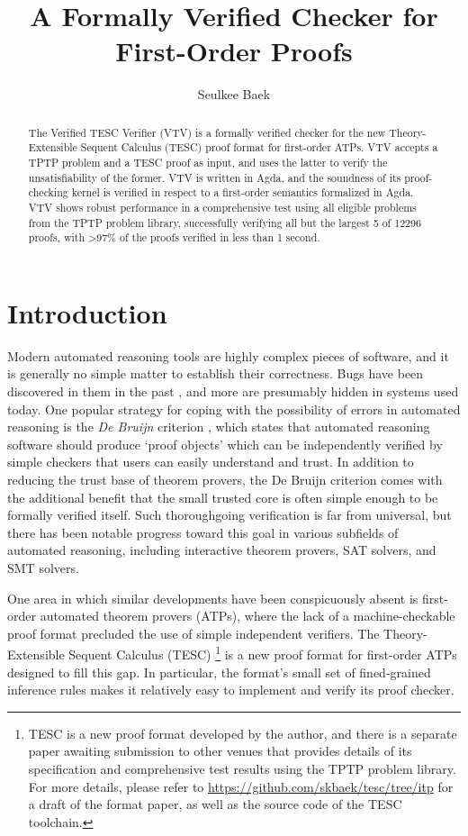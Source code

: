\documentclass{lipics-v2021}
\title{A Formally Verified Checker for First-Order Proofs}
\author{Seulkee Baek}{Department of Philosophy, Carnegie Mellon University, United States}{seulkeeb@andrew.cmu.edu}{}{}
\begin{document}
\maketitle

\begin{abstract}

The Verified TESC Verifier (VTV) is a formally verified checker for the new 
Theory-Extensible Sequent Calculus (TESC) proof format for first-order ATPs. 
VTV accepts a TPTP problem and a TESC proof as input, and uses the latter to 
verify the unsatisfiability of the former. VTV is written in Agda, and the 
soundness of its proof-checking kernel is verified in respect to a first-order
semantics formalized in Agda. VTV shows robust performance in a comprehensive 
test using all eligible problems from the TPTP problem library, successfully 
verifying all but the largest 5 of 12296 proofs, with >97\% of the 
proofs verified in less than 1 second. 

\end{abstract}

\section{Introduction}

Modern automated reasoning tools are highly complex pieces of software, 
and it is generally no simple matter to establish their correctness.
Bugs have been discovered in them in the past \cite{reger2017testing,harrison2006towards}, 
and more are presumably hidden in systems used today. 
One popular strategy for coping with the possibility of errors 
in automated reasoning is the \textit{De Bruijn} criterion \cite{barendregt2005challenge}, 
which states that automated reasoning software should produce `proof objects' which can be 
independently verified by simple checkers that users can easily understand 
and trust. In addition to reducing the trust base of theorem provers, 
the De Bruijn criterion comes with the additional benefit that the 
small trusted core is often simple enough to be formally verified itself. 
Such thoroughgoing verification is far from universal, but there has been notable 
progress toward this goal in various subfields of automated reasoning, including 
interactive theorem provers, SAT solvers, and SMT solvers.

One area in which similar developments have been conspicuously absent is 
first-order automated theorem provers (ATPs), where the lack of a machine-checkable
proof format \cite{reger2017checkable} precluded the use of simple independent verifiers. 
The Theory-Extensible Sequent Calculus (TESC) \footnote{TESC is a new proof format developed 
by the author, and there is a separate paper awaiting submission to other venues that provides
details of its specification and comprehensive test results using the TPTP problem library.
For more details, please refer to \url{https://github.com/skbaek/tesc/tree/itp} for a draft 
of the format paper, as well as the source code of the TESC toolchain.} is a new 
proof format for first-order ATPs designed to fill this gap. In particular,
the format's small set of fined-grained inference rules makes it relatively 
easy to implement and verify its proof checker.
\end{document}
